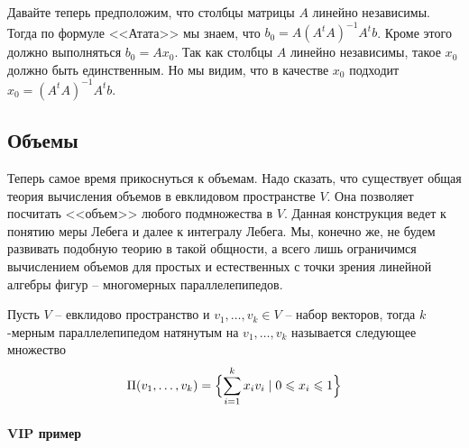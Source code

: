 Давайте теперь предположим, что столбцы матрицы $A$ линейно независимы.
Тогда по формуле <<Атата>> мы знаем, что $b_0 = A(A^tA)^{-1}A^tb$.
Кроме этого должно выполняться $b_0 = Ax_0$.
Так как столбцы $A$ линейно независимы, такое $x_0$ должно быть единственным.
Но мы видим, что в качестве $x_0$ подходит $x_0 = (A^tA)^{-1}A^tb$.

\subsection{Объемы}

Теперь самое время прикоснуться к объемам.
Надо сказать, что существует общая теория вычисления объемов в евклидовом пространстве $V$.
Она позволяет посчитать <<объем>> любого подмножества в $V$.
Данная конструкция ведет к понятию меры Лебега и далее к интегралу Лебега.
Мы, конечно же, не будем развивать подобную теорию в такой общности, а всего лишь ограничимся вычислением объемов для простых и естественных с точки зрения линейной алгебры фигур -- многомерных параллелепипедов.

\begin{definition}
Пусть $V$ -- евклидово пространство и $v_1,\ldots,v_k\in V$ -- набор векторов, тогда $k$-мерным параллелепипедом натянутым на $v_1,\ldots,v_k$ называется следующее множество
\[
\Pi(v_1,\ldots,v_k) = \Bigl\{\sum_{i=1}^k x_i v_i\mid 0\leqslant x_i \leqslant 1\Bigl\}
\]
\end{definition}

\paragraph{VIP пример}

